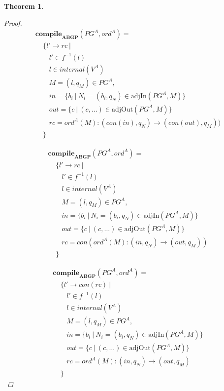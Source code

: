 \documentclass[twocolumn]{sig-alternate-10pt}
\newtheorem{thm}{Theorem}[section]
\begin{document}
\begin{thm}
\begin{proof}
    \[ \begin{array}{l}
       \textbf{compile}_\textbf{ABGP}(PG^A,ord^A) = \\
       ~~~~~ \{ l' \rightarrow rc ~\vert \\
       ~~~~~~~~~ l' \in f^{-1}(l) \\
       ~~~~~~~~~ l \in internal(V^A) \\
       ~~~~~~~~~ M = (l,q_M) \in PG^A, \\
       ~~~~~~~~~ in = \{ b_i ~\vert~ N_i = (b_i,q_N) \in \text{adjIn}(PG^A,M) \} \\
       ~~~~~~~~~ out = \{ c ~\vert~ (c,\dots) \in \text{adjOut}(PG^A,M) \} \\
       ~~~~~~~~~ rc = ord^A(M) : (con(in),q_N) \rightarrow (con(out),q_M)) \\
       ~~~~~ \}
    \end{array} \]%

    \[ \begin{array}{l}
       \textbf{compile}_\textbf{ABGP}(PG^A,ord^A) = \\
       ~~~~~ \{ l' \rightarrow rc ~\vert \\
       ~~~~~~~~~ l' \in f^{-1}(l) \\
       ~~~~~~~~~ l \in internal(V^A) \\
       ~~~~~~~~~ M = (l,q_M) \in PG^A, \\
       ~~~~~~~~~ in = \{ b_i ~\vert~ N_i = (b_i,q_N) \in \text{adjIn}(PG^A,M) \} \\
       ~~~~~~~~~ out = \{ c ~\vert~ (c,\dots) \in \text{adjOut}(PG^A,M) \} \\
       ~~~~~~~~~ rc = con(ord^A(M) : (in,q_N) \rightarrow (out,q_M)) \\
       ~~~~~ \}
    \end{array} \]%

    \[ \begin{array}{l}
       \textbf{compile}_\textbf{ABGP}(PG^A,ord^A) = \\
       ~~~~~ \{ l' \rightarrow con(rc) ~\vert \\
       ~~~~~~~~~ l' \in f^{-1}(l) \\
       ~~~~~~~~~ l \in internal(V^A) \\
       ~~~~~~~~~ M = (l,q_M) \in PG^A, \\
       ~~~~~~~~~ in = \{ b_i ~\vert~ N_i = (b_i,q_N) \in \text{adjIn}(PG^A,M) \} \\
       ~~~~~~~~~ out = \{ c ~\vert~ (c,\dots) \in \text{adjOut}(PG^A,M) \} \\
       ~~~~~~~~~ rc = ord^A(M) : (in,q_N) \rightarrow (out,q_M) \\
       ~~~~~ \}
    \end{array} \]%


\end{proof}
\end{thm}
\end{document}
